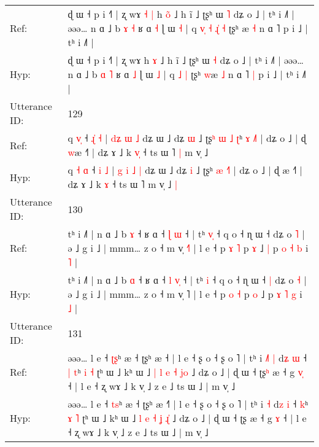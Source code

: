 \documentclass[10pt]{article}
\DeclareRobustCommand{\hl}[1]{{\textcolor{red}{#1}}}
\begin{document}
\begin{longtable}{ll}
Ref: & ɖ ɯ ˧ p i ˧˥ | ʐ wɤ\hl{ }\hl{˧}\hl{ }\hl{|} h \hl{o}\hl{̃} ˩ h ĩ ˩ ʈʂʰ ɯ \hl{˥} dʑ o ˩ | tʰ i ˩˥ | əəə… n ɑ ˩ b \hl{ɤ} \hl{˧} ʁ ɑ \hl{˧} ɭ ɯ \hl{˧} | q\hl{ }\hl{v}\hl{̩}\hl{ }\hl{˧} \hl{ɻ}\hl{̍} \hl{˧} ʈʂʰ \hl{}æ \hl{˧} n ɑ ˥\hl{}\hl{} p i ˩ | tʰ i ˩˥ |
 \\
Hyp: & ɖ ɯ ˧ p i ˧˥ | ʐ wɤ\hl{}\hl{}\hl{}\hl{} h \hl{}\hl{ɤ} ˩ h ĩ ˩ ʈʂʰ ɯ \hl{˧} dʑ o ˩ | tʰ i ˩˥ | əəə… n ɑ ˩ b \hl{ɑ} \hl{˥} ʁ ɑ \hl{˩} ɭ ɯ \hl{˩} | q\hl{}\hl{}\hl{}\hl{}\hl{} \hl{}\hl{˩} \hl{|} ʈʂʰ \hl{w}æ \hl{˩} n ɑ ˥\hl{ }\hl{|} p i ˩ | tʰ i ˩˥ |
 \\
\midrule
Utterance ID: & 129 \\
Ref: & q \hl{}\hl{v}\hl{̩} ˧ \hl{ɻ}\hl{̍} \hl{˧} | \hl{}\hl{d}\hl{ʑ} \hl{ɯ} \hl{˩} dʑ ɯ ˩ dʑ \hl{ɯ} ˩ ʈʂ\hl{ʰ}\hl{ }\hl{ɯ}\hl{ }\hl{˩}\hl{ }\hl{ʈ}ʰ \hl{ɤ} \hl{˩}˥ | dʑ o ˩ | ɖ \hl{w}æ ˧˥ | dʑ ɤ ˩ k \hl{v}\hl{̩} ˧ ts ɯ ˥\hl{ }\hl{|} m v̩ ˩\hl{}\hl{}
 \\
Hyp: & q \hl{˧}\hl{ }\hl{ɑ} ˧ \hl{}\hl{i} \hl{˩} | \hl{g}\hl{ }\hl{i} \hl{˩} \hl{|} dʑ ɯ ˩ dʑ \hl{i} ˩ ʈʂ\hl{}\hl{}\hl{}\hl{}\hl{}\hl{}\hl{}ʰ \hl{æ} \hl{˧}˥ | dʑ o ˩ | ɖ \hl{}æ ˧˥ | dʑ ɤ ˩ k \hl{}\hl{ɤ} ˧ ts ɯ ˥\hl{}\hl{} m v̩ ˩\hl{ }\hl{|}
 \\
\midrule
Utterance ID: & 130 \\
Ref: & tʰ i ˩˥ | n ɑ ˩ b \hl{ɤ} ˧ ʁ ɑ ˧ \hl{ɭ} \hl{}\hl{ɯ} ˧ | tʰ \hl{v}\hl{̩} ˧ q o ˧ ɳ ɯ ˧\hl{}\hl{} dʑ o \hl{˥} | ə ˩ g i ˩ | mmm… z o ˧ m v̩ \hl{˧}˥ | l e ˧ p \hl{ɤ} \hl{˥} p \hl{ɤ} ˩\hl{ }\hl{|} p \hl{o} \hl{˧} \hl{b} i \hl{˥} |
 \\
Hyp: & tʰ i ˩˥ | n ɑ ˩ b \hl{ɑ} ˧ ʁ ɑ ˧ \hl{l} \hl{v}\hl{̩} ˧ | tʰ \hl{}\hl{i} ˧ q o ˧ ɳ ɯ ˧\hl{ }\hl{|} dʑ o \hl{˧} | ə ˩ g i ˩ | mmm… z o ˧ m v̩ \hl{}˥ | l e ˧ p \hl{o} \hl{˧} p \hl{o} ˩\hl{}\hl{} p \hl{ɤ} \hl{˥} \hl{g} i \hl{˩} |
 \\
\midrule
Utterance ID: & 131 \\
Ref: & əəə… l e ˧ \hl{ʈ}\hl{ʂ}ʰ æ ˧ ʈʂʰ æ ˧\hl{} | l e ˧ ʂ o ˧ ʂ o ˥ | tʰ i\hl{ }\hl{˩}\hl{˥} \hl{|} d\hl{ʑ} \hl{ɯ} ˧\hl{ }\hl{|} \hl{t}ʰ \hl{i} \hl{˧} ʈʰ ɯ ˩ kʰ ɯ ˩ \hl{|} \hl{l} \hl{e} \hl{˧} \hl{j}\hl{o} ˩ dʑ o ˩ | ɖ ɯ ˧ ʈʂ\hl{ʰ} æ ˧ g \hl{v}\hl{̩} ˧ | l e ˧ ʐ wɤ ˩ k v̩ ˩ z e ˩ ts ɯ ˩ | m v̩ ˩
 \\
Hyp: & əəə… l e ˧ \hl{t}\hl{s}ʰ æ ˧ ʈʂʰ æ ˧\hl{˥} | l e ˧ ʂ o ˧ ʂ o ˥ | tʰ i\hl{}\hl{}\hl{} \hl{˧} d\hl{z} \hl{i} ˧\hl{}\hl{} \hl{k}ʰ \hl{ɤ} \hl{˥} ʈʰ ɯ ˩ kʰ ɯ ˩ \hl{l} \hl{e} \hl{˧} \hl{ʝ} \hl{ɻ}\hl{̍} ˩ dʑ o ˩ | ɖ ɯ ˧ ʈʂ\hl{} æ ˧ g \hl{}\hl{ɤ} ˧ | l e ˧ ʐ wɤ ˩ k v̩ ˩ z e ˩ ts ɯ ˩ | m v̩ ˩
 \\

\end{longtable}
\end{document}
